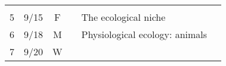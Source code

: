 \documentclass[]{article}
\begin{document}
\begin{longtable}[]{@{}ccclll@{}}
\begin{minipage}[t]{0.12\columnwidth}
\strut
\end{minipage}\tabularnewline
\begin{minipage}[t]{0.13\columnwidth}\centering\strut
5\strut
\end{minipage} & \begin{minipage}[t]{0.08\columnwidth}\centering\strut
9/15\strut
\end{minipage} & \begin{minipage}[t]{0.07\columnwidth}\centering\strut
F\strut
\end{minipage} & \begin{minipage}[t]{0.10\columnwidth}\raggedright\strut
\strut
\end{minipage} & \begin{minipage}[t]{0.12\columnwidth}\raggedright\strut
The ecological niche\strut
\end{minipage} & \begin{minipage}[t]{0.12\columnwidth}\raggedright\strut
\strut
\end{minipage}\tabularnewline
\begin{minipage}[t]{0.13\columnwidth}\centering\strut
6\strut
\end{minipage} & \begin{minipage}[t]{0.08\columnwidth}\centering\strut
9/18\strut
\end{minipage} & \begin{minipage}[t]{0.07\columnwidth}\centering\strut
M\strut
\end{minipage} & \begin{minipage}[t]{0.10\columnwidth}\raggedright\strut
\strut
\end{minipage} & \begin{minipage}[t]{0.12\columnwidth}\raggedright\strut
Physiological ecology: animals\strut
\end{minipage} & \begin{minipage}[t]{0.12\columnwidth}\raggedright\strut
\strut
\end{minipage}\tabularnewline
\begin{minipage}[t]{0.13\columnwidth}\centering\strut
7\strut
\end{minipage} & \begin{minipage}[t]{0.08\columnwidth}\centering\strut
9/20\strut
\end{minipage} & \begin{minipage}[t]{0.07\columnwidth}\centering\strut
W\strut
\end{minipage} & \begin{minipage}[t]{0.10\columnwidth}\raggedright\strut

\end{minipage}
\end{longtable}
\end{document}
